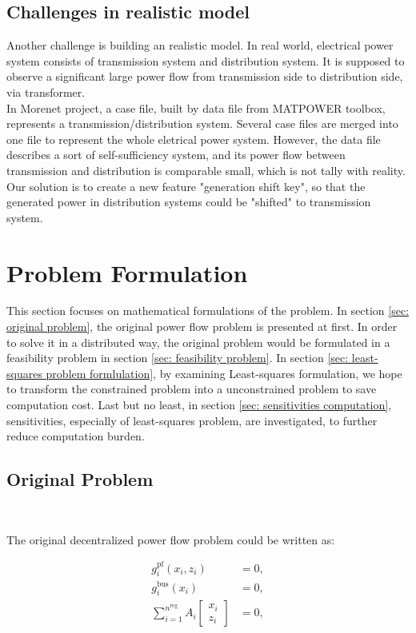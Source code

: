 \documentclass{article}
\newcommand{\n}{n}
\newcommand{\nregions}{\n^{\text{reg}}}
\newcommand{\stateCore}{x}
\newcommand{\stateCopy}{z}
\newcommand{\pf}{g^{\text{pf}}}
\newcommand{\busspecs}{g^{\text{bus}}}
\begin{document}
\subsection{Challenges in realistic model}
Another challenge is building an realistic model. In real world, electrical power system consists of transmission system and distribution system. It is supposed to observe a significant large power flow from transmission side to distribution side, via transformer. \\ 

In Morenet project, a case file, built by data file from MATPOWER toolbox, represents a transmission/distribution system. Several case files are merged into one file to represent the whole eletrical power system. However, the data file describes a sort of self-sufficiency system, and its power flow between transmission and distribution is comparable small, which is not tally with reality.\\

Our solution is to create a new feature "generation shift key", so that the generated power in distribution systems could be "shifted" to transmission system.
\newpage

\section{Problem Formulation}
This section focuses on mathematical formulations of the problem. In section \ref{sec: original problem}, the original power flow problem is presented at first. In order to solve it in a distributed way, the original problem would be formulated in a feasibility problem in section \ref{sec: feasibility problem}. In section \ref{sec: least-squares problem formlulation}, by examining Least-squares formulation, we hope to transform the constrained problem into a unconstrained problem to save computation cost. Last but no least, in section \ref{sec: sensitivities computation}, sensitivities, especially of least-squares problem, are investigated, to further reduce computation burden.

\subsection{Original Problem}~\label{sec: original problem}

The original decentralized power flow problem could be written as:

    \begin{subequations}
        \label{eq:dist-power-flow-problem}
        \begin{align}
            \pf_i( \stateCore_i, \stateCopy_i ) &= 0, \\
            \busspecs_i ( \stateCore_i ) &= 0, \\
            \sum_{i = 1}^{\nregions} A_i \begin{bmatrix}
                \stateCore_i \\
                \stateCopy_i
            \end{bmatrix}
            &= 0,
        \end{align}
    \end{subequations}
\end{document}
